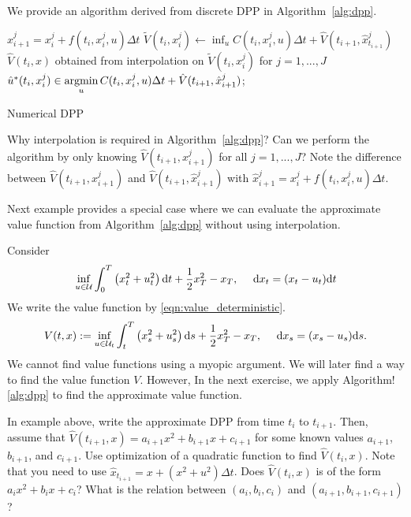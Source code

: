 \documentclass[11pt]{book}
\newcommand{\dt}{\text{\normalfont d}t}
\newcommand{\ds}{\text{\normalfont d}s}
\newcommand{\dx}{\text{\normalfont d}x}
\begin{document}
We provide an algorithm derived from discrete DPP in Algorithm~\ref{alg:dpp}.
\begin{algorithm}
        {$\hat{x}^j_{i+1}=x_i^j+f(t_{i},x_i^j,u)\Delta t$\;
        $\tilde{V}(t_{i},x^j_i)\leftarrow \inf_{u}C(t_{i},{x}^j_{i},u){{\Delta t}}+\hat{V}(t_{i+1},\hat{x}^j_{t_{i+1}})$\;
        $\hat{V}(t_{i},x)$ obtained from interpolation on $\tilde{V}(t_{i},x^j_i)$ for $j=1,...,J$\;
        $\hat{u}^*(t_i,x_i^j)\in\mathop{\text{\normalfont argmin}}\limits_{u}C(t_{i},{x}^j_{i},u){{\Delta t}}+\hat{V}(t_{i+1},\hat{x}^j_{i+1})$;
        }
        \caption{Numerical DPP}
         \label{alg:dpp}
\end{algorithm}
\begin{ex}
    Why interpolation is required in Algorithm~\ref{alg:dpp}? Can we perform the algorithm by only knowing  $\hat{V}(t_{i+1},{x}^j_{i+1})$ for all $j=1,...,J$? 
    Note the difference between $\hat{V}(t_{i+1},{x}^j_{i+1})$ and $\hat{V}(t_{i+1},\hat{x}^j_{i+1})$ with $\hat{x}^j_{i+1} = {x}^j_{i} + f(t_{i},x_i^j,u)\Delta t$.
\end{ex}
Next example provides a special case where we can evaluate the approximate value function from Algorithm~\ref{alg:dpp} without using interpolation.
\begin{eg}
    Consider 
    \begin{equation}
    \inf_{u\in\mathcal{U}} \int_0^T\left(x_t^2+u_t^2\right){{\dt}}+\frac12x_T^2-x_T,~~~~{\dx}_t=(x_t-u_t){{\dt}}
\end{equation}
We write the value function by \eqref{eqn:value_deterministic}. 
\begin{equation}
    V(t,x):= \inf_{u\in\mathcal{U}_{t}}\int_t^T\left(x_s^2+u_s^2\right){{\ds}}+\frac12x_T^2-x_T,~~~~{\dx}_s=(x_s-u_s){{\ds}}.
\end{equation}
We cannot find value functions using a myopic argument. We will later find a way to find the value function $V$. However, In the next exercise, we apply Algorithm!\ref{alg:dpp} to find the approximate value function.  
\end{eg}
\begin{ex}\label{ex:discrete_lqc}
    In example above, write the approximate DPP from time $t_{i}$ to $t_{i+1}$. Then, assume that $\hat{V}(t_{i+1},x)=a_{i+1}x^2+b_{i+1}x+c_{i+1}$ for some known values $a_{i+1}$, $b_{i+1}$, and $c_{i+1}$. Use  optimization of a quadratic function to find $\hat{V}(t_{i},x)$. Note that you need to use $\hat{x}_{t_{i+1}}=x+(x^2+u^2)\Delta t$. Does $\hat{V}(t_{i},x)$ is of the form $a_{i}x^2+b_{i}x+c_{i}$? What is the relation between $(a_{i},b_{i},c_{i})$ and $(a_{i+1},b_{i+1},c_{i+1})$?
\end{ex}
\end{document}
